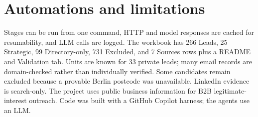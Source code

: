\documentclass[10pt,a4paper]{article}
\begin{document}
\section{Automations and limitations}
Stages can be run from one command, HTTP and model responses are cached for resumability, and LLM calls are logged. The workbook has 266 Leads, 25 Strategic, 99 Directory-only, 731 Excluded, and 7 Sources rows plus a README and Validation tab. Units are known for 33 private leads; many email records are domain-checked rather than individually verified. Some candidates remain excluded because a provable Berlin postcode was unavailable. LinkedIn evidence is search-only. The project uses public business information for B2B legitimate-interest outreach. Code was built with a GitHub Copilot harness; the agents use an LLM.
\end{document}
